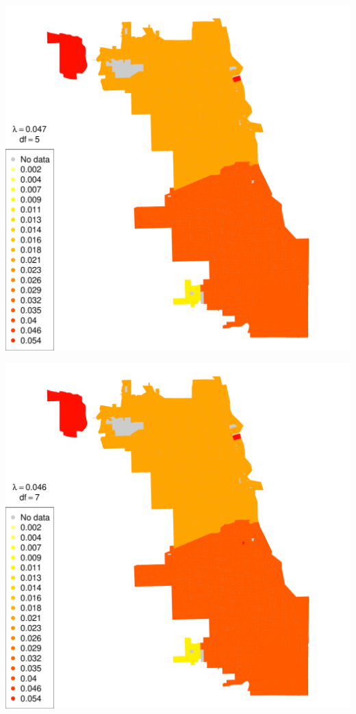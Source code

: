 \begin{frame}

  \includegraphics[height=\textheight]{img/chicago_rob_5df.pdf}

\end{frame}

\begin{frame}

  \includegraphics[height=\textheight]{img/chicago_rob_7df.pdf}

\end{frame}

